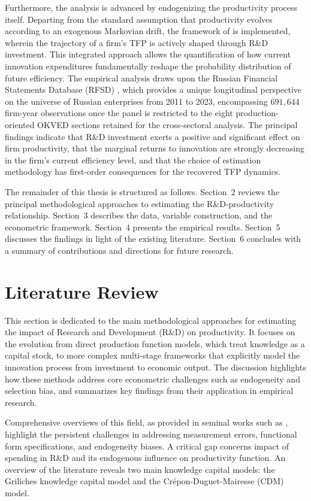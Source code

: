 \documentclass[a4paper, 12pt]{article}
\begin{document}
Furthermore, the analysis is advanced by endogenizing the productivity process itself. Departing from the standard assumption that productivity evolves according to an exogenous Markovian drift, the framework of \textcite{doraszelski2013r} is implemented, wherein the trajectory of a firm’s TFP is actively shaped through R\&D investment. This integrated approach allows the quantification of how current innovation expenditures fundamentally reshape the probability distribution of future efficiency. The empirical analysis draws upon the Russian Financial Statements Database (RFSD) \parencite{bondarkov2025russian}, which provides a unique longitudinal perspective on the universe of Russian enterprises from 2011 to 2023, encompassing $691{,}644$ firm-year observations once the panel is restricted to the eight production-oriented OKVED sections retained for the cross-sectoral analysis. The principal findings indicate that R\&D investment exerts a positive and significant effect on firm productivity, that the marginal returns to innovation are strongly decreasing in the firm’s current efficiency level, and that the choice of estimation methodology has first-order consequences for the recovered TFP dynamics.

The remainder of this thesis is structured as follows. Section~2 reviews the principal methodological approaches to estimating the R\&D-productivity relationship. Section~3 describes the data, variable construction, and the econometric framework. Section~4 presents the empirical results. Section~5 discusses the findings in light of the existing literature. Section~6 concludes with a summary of contributions and directions for future research.

\section{Literature Review}
\label{sec:literature}
This section is dedicated to the main methodological approaches for estimating the impact of Research and Development (R\&D) on productivity. It focuses on the evolution from direct production function models, which treat knowledge as a capital stock, to more complex multi-stage frameworks that explicitly model the innovation process from investment to economic output. The discussion highlights how these methods address core econometric challenges such as endogeneity and selection bias, and summarizes key findings from their application in empirical research.

Comprehensive overviews of this field, as provided in seminal works such as \parencite{griliches1979issues,crepon1998research}, highlight the persistent challenges in addressing measurement errors, functional form specifications, and endogeneity biases. A critical gap concerns impact of spending in R\&D and its endogenous influence on productivity function. An overview of the literature reveals two main knowledge capital models: the Griliches knowledge capital model \parencite{griliches1979issues} and the Crépon-Duguet-Mairesse (CDM)\parencite{crepon1998research} model. 
\end{document}
